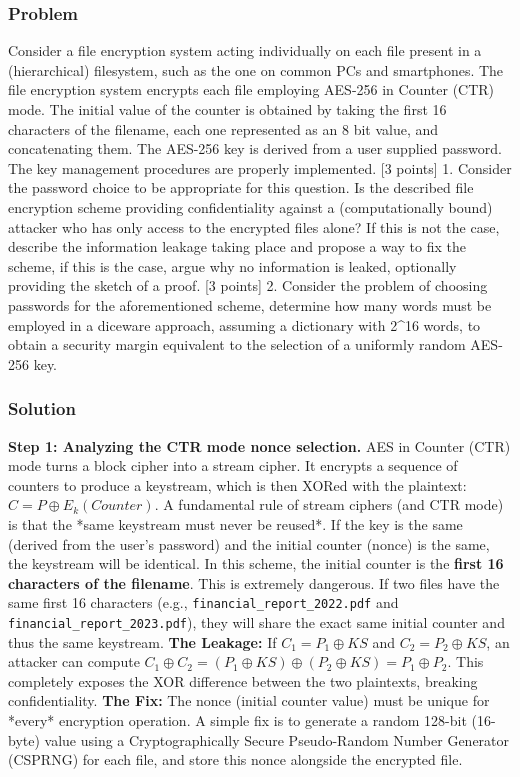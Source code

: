 \documentclass{article}
\begin{document}
\subsubsection*{Problem}
Consider a file encryption system acting individually on each file present in a (hierarchical) filesystem, such as the one on common PCs and smartphones. The file encryption system encrypts each file employing AES-256 in Counter (CTR) mode. The initial value of the counter is obtained by taking the first 16 characters of the filename, each one represented as an 8 bit value, and concatenating them. The AES-256 key is derived from a user supplied password. The key management procedures are properly implemented.
[3 points] 1. Consider the password choice to be appropriate for this question. Is the described file encryption scheme providing confidentiality against a (computationally bound) attacker who has only access to the encrypted files alone? If this is not the case, describe the information leakage taking place and propose a way to fix the scheme, if this is the case, argue why no information is leaked, optionally providing the sketch of a proof.
[3 points] 2. Consider the problem of choosing passwords for the aforementioned scheme, determine how many words must be employed in a diceware approach, assuming a dictionary with 2\textasciicircum{}16 words, to obtain a security margin equivalent to the selection of a uniformly random AES-256 key.

\subsubsection*{Solution}
\textbf{Step 1: Analyzing the CTR mode nonce selection.}
AES in Counter (CTR) mode turns a block cipher into a stream cipher. It encrypts a sequence of counters to produce a keystream, which is then XORed with the plaintext: $C = P \oplus E_k(Counter)$.
A fundamental rule of stream ciphers (and CTR mode) is that the *same keystream must never be reused*. If the key is the same (derived from the user's password) and the initial counter (nonce) is the same, the keystream will be identical.
In this scheme, the initial counter is the \textbf{first 16 characters of the filename}. This is extremely dangerous. If two files have the same first 16 characters (e.g., \texttt{financial\_report\_2022.pdf} and \texttt{financial\_report\_2023.pdf}), they will share the exact same initial counter and thus the same keystream.
\textbf{The Leakage:} If $C_1 = P_1 \oplus KS$ and $C_2 = P_2 \oplus KS$, an attacker can compute $C_1 \oplus C_2 = (P_1 \oplus KS) \oplus (P_2 \oplus KS) = P_1 \oplus P_2$. This completely exposes the XOR difference between the two plaintexts, breaking confidentiality.
\textbf{The Fix:} The nonce (initial counter value) must be unique for *every* encryption operation. A simple fix is to generate a random 128-bit (16-byte) value using a Cryptographically Secure Pseudo-Random Number Generator (CSPRNG) for each file, and store this nonce alongside the encrypted file.
\end{document}
